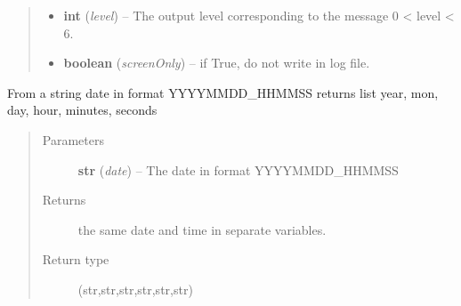 \documentclass[a4paper,10pt,english]{sphinxmanual}
\begin{document}
\begin{fulllineitems}
\begin{fulllineitems}
\begin{quote}
\begin{description}
\begin{itemize}
\item {} 
\textbf{int} (\emph{level}) -- The output level corresponding 
to the message 0 \textless{} level \textless{} 6.

\item {} 
\textbf{boolean} (\emph{screenOnly}) -- if True, do not write in log file.

\end{itemize}

\end{description}\end{quote}

\end{fulllineitems}


\end{fulllineitems}


\begin{fulllineitems}
\label{commands/apidoc/src:src.logger.date_to_datetime}
From a string date in format YYYYMMDD\_HHMMSS
returns list year, mon, day, hour, minutes, seconds
\begin{quote}\begin{description}
\item[{Parameters}] \leavevmode
\textbf{str} (\emph{date}) -- The date in format YYYYMMDD\_HHMMSS

\item[{Returns}] \leavevmode
the same date and time in separate variables.

\item[{Return type}] \leavevmode
(str,str,str,str,str,str)

\end{description}\end{quote}

\end{fulllineitems}

\end{document}
